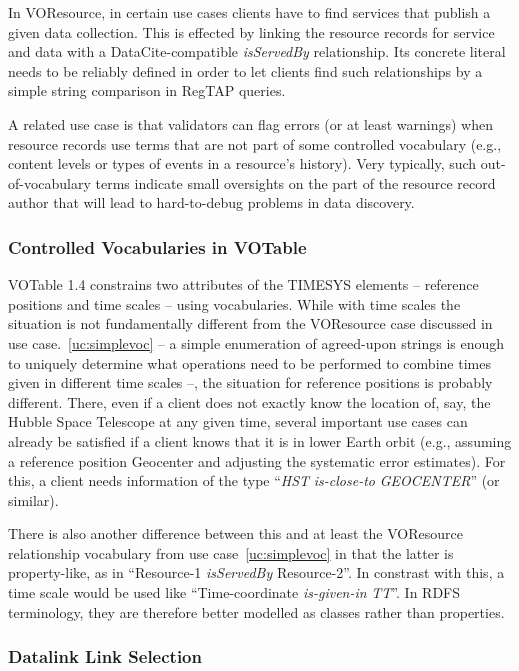 \documentclass[11pt,a4paper]{ivoa}
\newcommand{\vocterm}[1]{\emph{\color{termcolor}#1}}
\begin{document}
In VOResource, in certain use cases clients have to find services that
publish a given data collection.  This is effected by linking the resource
records for service and data with a
DataCite-compatible \vocterm{isServedBy} relationship.
Its concrete literal needs to be reliably defined in order to let
clients find such relationships by a simple string comparison in RegTAP
queries.

A related use case is that validators can flag errors (or at least
warnings) when resource records use terms that are not part of some
controlled vocabulary (e.g., content levels or types of events in a
resource's history).  Very typically, such out-of-vocabulary terms
indicate small oversights on the part of the resource record author that
will lead to hard-to-debug problems in data discovery.

\subsubsection{Controlled Vocabularies in VOTable}
\label{uc:votvoc}

VOTable 1.4 constrains two attributes of the TIMESYS elements 
-- reference positions and time
scales -- using vocabularies.  
While with time scales the situation is not fundamentally
different from the VOResource case discussed in
use case.~\ref{uc:simplevoc} -- a simple enumeration of agreed-upon strings
is enough to uniquely determine what operations need to be performed to
combine times given in different time scales --, the situation for
reference positions is probably different. There, even if a client does
not exactly know the location of, say, the Hubble Space Telescope at any
given time, several important use cases can already be satisfied if a
client knows that it is in lower Earth orbit (e.g., assuming a reference
position Geocenter and adjusting the systematic error estimates).  For
this, a client needs information of the type ``\vocterm{HST}
\vocterm{is-close-to} \vocterm{GEOCENTER\/}'' (or similar).

There is also another difference between this and at least the
VOResource relationship vocabulary from use case~\ref{uc:simplevoc}
in that the latter is property-like, as
in ``Resource-1 \vocterm{isServedBy} Resource-2\/''.  In constrast with
this, a time scale would be used like ``Time-coordinate
\vocterm{is-given-in}
\vocterm{TT\/}''.  In RDFS terminology, they are therefore better modelled
as classes rather than properties.

\subsubsection{Datalink Link Selection}
\label{uc:links}
\end{document}
